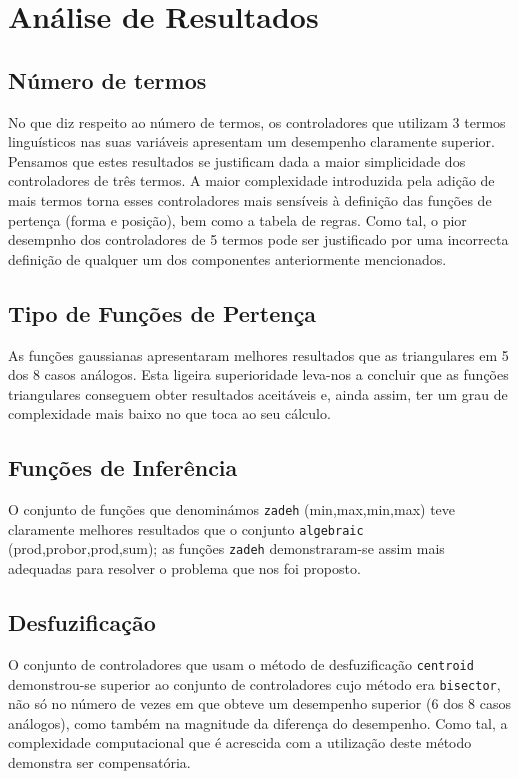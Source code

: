 \documentclass{article}
\begin{document}
\section{Análise de Resultados}

\subsection{Número de termos}
\indent \indent No que diz respeito ao número de termos, os controladores que utilizam 3 termos linguísticos nas suas variáveis apresentam um desempenho claramente superior. Pensamos que estes resultados se justificam dada a maior simplicidade dos controladores de três termos. A maior complexidade introduzida pela adição de mais termos torna esses controladores mais sensíveis à definição das funções de pertença (forma e posição), bem como a tabela de regras. Como tal, o pior desempnho dos controladores de 5 termos pode ser justificado por uma incorrecta definição de qualquer um dos componentes anteriormente mencionados.

\subsection{Tipo de Funções de Pertença}
\indent \indent As funções gaussianas apresentaram melhores resultados que as triangulares em 5 dos 8 casos análogos. Esta ligeira superioridade leva-nos a concluir que as funções triangulares conseguem obter resultados aceitáveis e, ainda assim, ter um grau de complexidade mais baixo no que toca ao seu cálculo.

\subsection{Funções de Inferência}
\indent \indent O conjunto de funções que denominámos \texttt{zadeh} (min,max,min,max) teve claramente melhores resultados que o conjunto \texttt{algebraic} (prod,probor,prod,sum); as funções \texttt{zadeh} demonstraram-se assim mais adequadas para resolver o problema que nos foi proposto.

\subsection{Desfuzificação}
\indent \indent O conjunto de controladores que usam o método de desfuzificação \texttt{centroid} demonstrou-se superior ao conjunto de controladores cujo método era \texttt{bisector}, não só no número de vezes em que obteve um desempenho superior (6 dos 8 casos análogos), como também na magnitude da diferença do desempenho. Como tal, a complexidade computacional que é acrescida com a utilização deste método demonstra ser compensatória.
\end{document}
